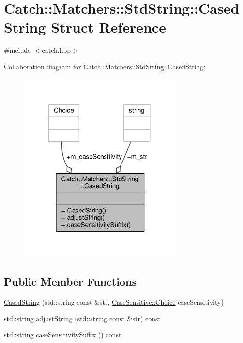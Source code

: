 \hypertarget{struct_catch_1_1_matchers_1_1_std_string_1_1_cased_string}{\section{Catch\-:\-:Matchers\-:\-:Std\-String\-:\-:Cased\-String Struct Reference}
\label{struct_catch_1_1_matchers_1_1_std_string_1_1_cased_string}
}


{\ttfamily \#include $<$catch.\-hpp$>$}



Collaboration diagram for Catch\-:\-:Matchers\-:\-:Std\-String\-:\-:Cased\-String\-:
\nopagebreak
\begin{figure}[H]
\begin{center}
\leavevmode
\includegraphics[width=236pt]{struct_catch_1_1_matchers_1_1_std_string_1_1_cased_string__coll__graph}
\end{center}
\end{figure}
\subsection*{Public Member Functions}
\begin{DoxyCompactItemize}
\item 
\hyperlink{struct_catch_1_1_matchers_1_1_std_string_1_1_cased_string_aa88bbc5acd2bff22351d8d4b1816b561}{Cased\-String} (std\-::string const \&str, \hyperlink{struct_catch_1_1_case_sensitive_aad49d3aee2d97066642fffa919685c6a}{Case\-Sensitive\-::\-Choice} case\-Sensitivity)
\item 
std\-::string \hyperlink{struct_catch_1_1_matchers_1_1_std_string_1_1_cased_string_a0ff84e194426c8f4bca0660b9180d20d}{adjust\-String} (std\-::string const \&str) const 
\item 
std\-::string \hyperlink{struct_catch_1_1_matchers_1_1_std_string_1_1_cased_string_a1113c80dd02967032a99290bdcd1b590}{case\-Sensitivity\-Suffix} () const 
\end{DoxyCompactItemize}

